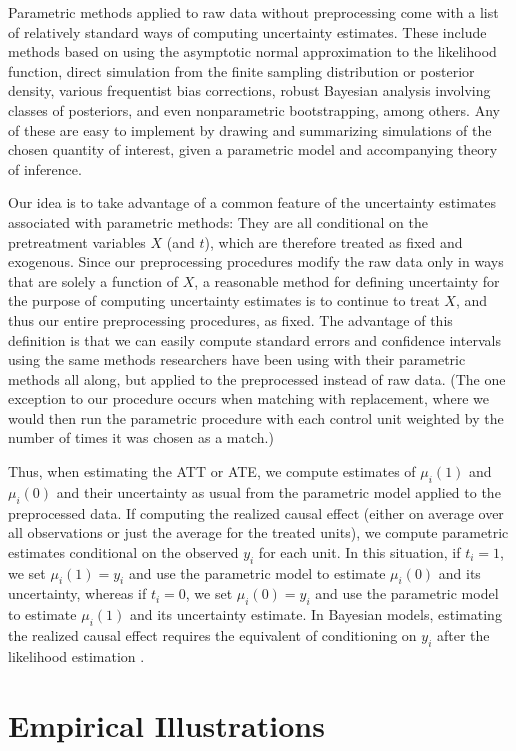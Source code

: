 \documentclass[11pt,titlepage]{article}
\begin{document}
Parametric methods applied to raw data without preprocessing come with
a list of relatively standard ways of computing uncertainty estimates.
These include methods based on using the asymptotic normal
approximation to the likelihood function, direct simulation from the
finite sampling distribution or posterior density, various frequentist
bias corrections, robust Bayesian analysis involving classes of
posteriors, and even nonparametric bootstrapping, among others.  Any
of these are easy to implement by drawing and summarizing simulations
of the chosen quantity of interest, given a parametric model and
accompanying theory of inference.

Our idea is to take advantage of a common feature of the uncertainty
estimates associated with parametric methods: They are all conditional
on the pretreatment variables $X$ (and $t$), which are therefore
treated as fixed and exogenous.  Since our preprocessing procedures
modify the raw data only in ways that are solely a function of $X$, a
reasonable method for defining uncertainty for the purpose of computing
uncertainty estimates is to continue to treat $X$, and thus our entire
preprocessing procedures, as fixed.  The advantage of this definition
is that we can easily compute standard errors and confidence intervals
using the same methods researchers have been using with their
parametric methods all along, but applied to the preprocessed instead
of raw data.  (The one exception to our procedure occurs when matching
with replacement, where we would then run the parametric procedure
with each control unit weighted by the number of times it was chosen
as a match.)

Thus, when estimating the ATT or ATE, we compute estimates of
$\mu_i(1)$ and $\mu_i(0)$ and their uncertainty as usual from the
parametric model applied to the preprocessed data.  If computing the
realized causal effect (either on average over all observations or
just the average for the treated units), we compute parametric
estimates conditional on the observed $y_i$ for each unit.  In this
situation, if $t_i=1$, we set $\mu_i(1)=y_i$ and use the parametric
model to estimate $\mu_i(0)$ and its uncertainty, whereas if $t_i=0$,
we set $\mu_i(0)=y_i$ and use the parametric model to estimate
$\mu_i(1)$ and its uncertainty estimate.  In Bayesian models,
estimating the realized causal effect requires the equivalent of
conditioning on $y_i$ after the likelihood estimation \citep[as
in][]{King97}.

\section{Empirical Illustrations}
\end{document}

